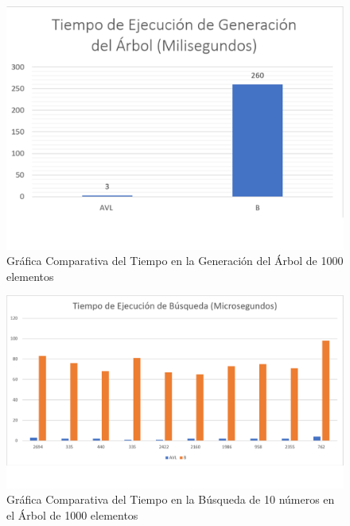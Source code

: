 \documentclass[acmsmall]{acmart}
\begin{document}
\begin{figure}[htbp]
  \centering
  \caption{Gráfica Comparativa del Tiempo en la Generación del Árbol de 1000 elementos}

  \includegraphics[angle=0,scale=0.6]{1000.1 elem.png}
  
\end{figure}
\begin{figure}[hp]
  \centering
  \caption{Gráfica Comparativa del Tiempo en la Búsqueda de 10 números en el Árbol de 1000 elementos}

  \includegraphics[angle=0,scale=0.5]{1000.2 elem.png}
  
\end{figure}
\end{document}
